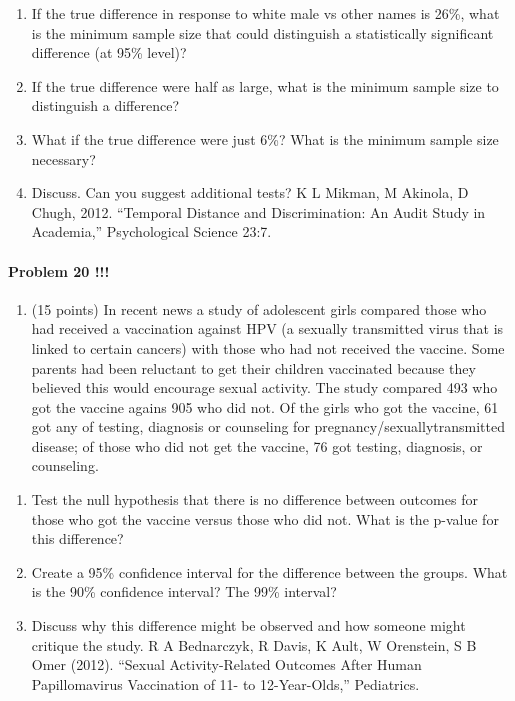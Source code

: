 \documentclass[]{article}
\providecommand{\tightlist}{%
  \setlength{\itemsep}{0pt}\setlength{\parskip}{0pt}}
\let\oldparagraph\paragraph
\renewcommand{\paragraph}[1]{\oldparagraph{#1}\mbox{}}
\begin{document}
\begin{enumerate}
\def\labelenumi{\alph{enumi}.}
\tightlist
\item
  If the true difference in response to white male vs other names is
  26\%, what is the minimum sample size that could distinguish a
  statistically significant difference (at 95\% level)?
\item
  If the true difference were half as large, what is the minimum sample
  size to distinguish a difference?
\item
  What if the true difference were just 6\%? What is the minimum sample
  size necessary?
\item
  Discuss. Can you suggest additional tests? K L Mikman, M Akinola, D
  Chugh, 2012. ``Temporal Distance and Discrimination: An Audit Study in
  Academia,'' Psychological Science 23:7.
\end{enumerate}

\paragraph{Problem 20 !!!}\label{problem-20}

\begin{enumerate}
\def\labelenumi{\arabic{enumi}.}
\setcounter{enumi}{21}
\tightlist
\item
  (15 points) In recent news a study of adolescent girls compared those
  who had received a vaccination against HPV (a sexually transmitted
  virus that is linked to certain cancers) with those who had not
  received the vaccine. Some parents had been reluctant to get their
  children vaccinated because they believed this would encourage sexual
  activity. The study compared 493 who got the vaccine agains 905 who
  did not. Of the girls who got the vaccine, 61 got any of testing,
  diagnosis or counseling for pregnancy/sexuallytransmitted disease; of
  those who did not get the vaccine, 76 got testing, diagnosis, or
  counseling.
\end{enumerate}

\begin{enumerate}
\def\labelenumi{\alph{enumi}.}
\tightlist
\item
  Test the null hypothesis that there is no difference between outcomes
  for those who got the vaccine versus those who did not. What is the
  p-value for this difference?
\item
  Create a 95\% confidence interval for the difference between the
  groups. What is the 90\% confidence interval? The 99\% interval?
\item
  Discuss why this difference might be observed and how someone might
  critique the study. R A Bednarczyk, R Davis, K Ault, W Orenstein, S B
  Omer (2012). ``Sexual Activity-Related Outcomes After Human
  Papillomavirus Vaccination of 11- to 12-Year-Olds,'' Pediatrics.
\end{enumerate}
\end{document}
